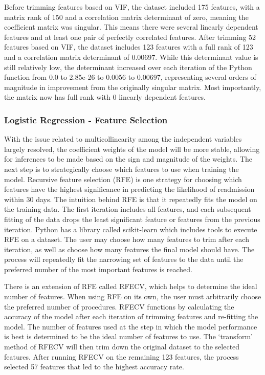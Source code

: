 \documentclass[sigconf]{acmart}
\begin{document}
Before trimming features based on VIF, the dataset included 175 features, with a matrix rank of 150 and a correlation matrix determinant of zero, meaning the coefficient matrix was singular. This means there were several linearly dependent features and at least one pair of perfectly correlated features. After trimming 52 features based on VIF, the dataset includes 123 features with a full rank of 123 and a correlation matrix determinant of 0.00697. While this determinant value is still relatively low, the determinant increased over each iteration of the Python function from 0.0 to 2.85e-26 to 0.0056 to 0.00697, representing several orders of magnitude in improvement from the originally singular matrix. Most importantly, the matrix now has full rank with 0 linearly dependent features.

\subsubsection{Logistic Regression - Feature Selection}

With the issue related to multicollinearity among the independent variables largely resolved, the coefficient weights of the model will be more stable, allowing for inferences to be made based on the sign and magnitude of the weights. The next step is to strategically choose which features to use when training the model. Recursive feature selection (RFE) is one strategy for choosing which features have the highest significance in predicting the likelihood of readmission within 30 days. The intuition behind RFE is that it repeatedly fits the model on the training data. The first iteration includes all features, and each subsequent fitting of the data drops the least significant feature or features from the previous iteration. Python has a library called scikit-learn which includes tools to execute RFE on a dataset. The user may choose how many features to trim after each iteration, as well as choose how many features the final model should have. The process will repeatedly fit the narrowing set of features to the data until the preferred number of the most important features is reached.

There is an extension of RFE called RFECV, which helps to determine the ideal number of features. When using RFE on its own, the user must arbitrarily choose the preferred number of procedures. RFECV functions by calculating the accuracy of the model after each iteration of trimming features and re-fitting the model. The number of features used at the step in which the model performance is best is determined to be the ideal number of features to use. The `transform' method of RFECV will then trim down the original dataset to the selected features. After running RFECV on the remaining 123 features, the process selected 57 features that led to the highest accuracy rate. 
\end{document}
